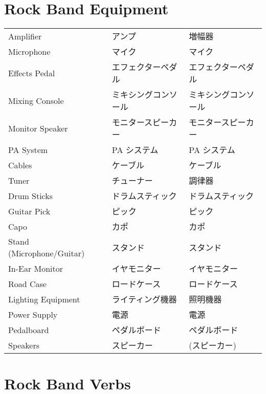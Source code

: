 \documentclass[11pt]{article}
\begin{document}
\section*{Rock Band Equipment}
\label{sec:orgae7fa71}
\begin{center}
\begin{tabular}{lll}
Amplifier & アンプ & 増幅器\\[0pt]
Microphone & マイク & マイク\\[0pt]
Effects Pedal & エフェクターペダル & エフェクターペダル\\[0pt]
Mixing Console & ミキシングコンソール & ミキシングコンソール\\[0pt]
Monitor Speaker & モニタースピーカー & モニタースピーカー\\[0pt]
PA System & PA システム & PA システム\\[0pt]
Cables & ケーブル & ケーブル\\[0pt]
Tuner & チューナー & 調律器\\[0pt]
Drum Sticks & ドラムスティック & ドラムスティック\\[0pt]
Guitar Pick & ピック & ピック\\[0pt]
Capo & カポ & カポ\\[0pt]
Stand (Microphone/Guitar) & スタンド & スタンド\\[0pt]
In-Ear Monitor & イヤモニター & イヤモニター\\[0pt]
Road Case & ロードケース & ロードケース\\[0pt]
Lighting Equipment & ライティング機器 & 照明機器\\[0pt]
Power Supply & 電源 & 電源\\[0pt]
Pedalboard & ペダルボード & ペダルボード\\[0pt]
Speakers & スピーカー & (スピーカー)\\[0pt]
\end{tabular}
\end{center}


\section*{Rock Band Verbs}
\label{sec:org7b6c4ed}
\end{document}
